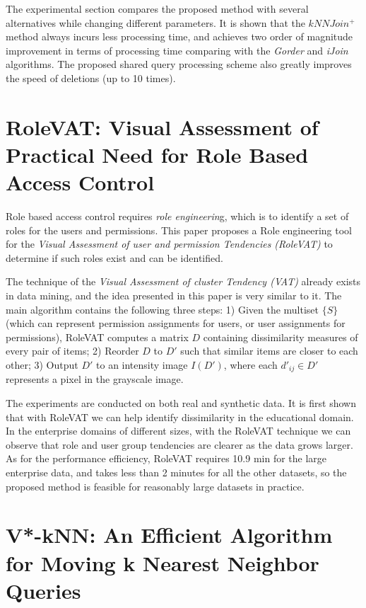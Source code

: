 \documentclass[paper=a4, fontsize=18pt]{article} %
\numberwithin{equation}{section} %
\numberwithin{figure}{section} %
\numberwithin{table}{section} %
\begin{document}
The experimental section compares the proposed method with several alternatives while changing different parameters. It is shown that the $kNNJoin^+$ method always incurs less processing time, and achieves two order of magnitude improvement in terms of processing time comparing with the \emph{Gorder} \cite{XLOH04} and \emph{iJoin} \cite{YCWS07} algorithms. The proposed shared query processing scheme also greatly improves the speed of deletions (up to 10 times).

\section{RoleVAT: Visual Assessment of Practical Need for Role Based Access Control \cite{ZRVZ09}}

Role based access control requires \emph{role engineerin}g, which is to identify a set of roles for the users and permissions. This paper proposes a Role engineering tool for the \emph{Visual Assessment of user and permission Tendencies (RoleVAT)} to determine if such roles exist and can be identified.

The technique of the \emph{Visual Assessment of cluster Tendency (VAT)} \cite{HBH05,WGBLR08} already exists in data mining, and the idea presented in this paper is very similar to it. The main algorithm contains the following three steps: 1) Given the multiset $\{S\}$ (which can represent permission assignments for users, or user assignments for permissions), RoleVAT computes a matrix $D$ containing dissimilarity measures of every pair of items; 2) Reorder $D$ to $D'$ such that similar items are closer to each other; 3) Output $D'$ to an intensity image $I(D')$, where each $d'_{ij} \in D'$ represents a pixel in the grayscale image.

The experiments are conducted on both real and synthetic data. It is first shown that with RoleVAT we can help identify dissimilarity in the educational domain. In the enterprise domains of different sizes, with the RoleVAT technique we can observe that role and user group tendencies are clearer as the data grows larger. As for the performance efficiency, RoleVAT requires 10.9 min for the large enterprise data, and takes less than 2 minutes for all the other datasets, so the proposed method is feasible for reasonably large datasets in practice.

\section{V*-kNN: An Efficient Algorithm for Moving k Nearest Neighbor Queries \cite{NZTK09}}\label{sec:demo}
\end{document}
